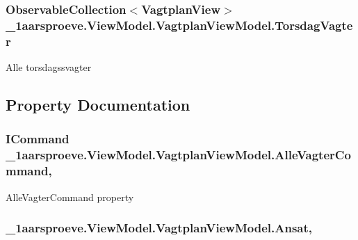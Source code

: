 \subsubsection[{Torsdag\+Vagter}]{\setlength{\rightskip}{0pt plus 5cm}Observable\+Collection$<${\bf Vagtplan\+View}$>$ \+\_\+1aarsproeve.\+View\+Model.\+Vagtplan\+View\+Model.\+Torsdag\+Vagter}\label{class__1aarsproeve_1_1_view_model_1_1_vagtplan_view_model_a85143514a9445a534a3518738e53df82}


Alle torsdagssvagter 



\subsection{Property Documentation}
\hypertarget{class__1aarsproeve_1_1_view_model_1_1_vagtplan_view_model_a9ff1365b62555d179cf34a5e11a6d5fc}{}
\subsubsection[{Alle\+Vagter\+Command}]{\setlength{\rightskip}{0pt plus 5cm}I\+Command \+\_\+1aarsproeve.\+View\+Model.\+Vagtplan\+View\+Model.\+Alle\+Vagter\+Command\hspace{0.3cm}{\ttfamily [get]}, {\ttfamily [set]}}\label{class__1aarsproeve_1_1_view_model_1_1_vagtplan_view_model_a9ff1365b62555d179cf34a5e11a6d5fc}


Alle\+Vagter\+Command property 

\hypertarget{class__1aarsproeve_1_1_view_model_1_1_vagtplan_view_model_acfc1e3ec69784426fcdecb303c0c1f94}{}
\subsubsection[{Ansat}]{ \+\_\+1aarsproeve.\+View\+Model.\+Vagtplan\+View\+Model.\+Ansat\hspace{0.3cm}{\ttfamily [get]}, {\ttfamily [set]}}\label{class__1aarsproeve_1_1_view_model_1_1_vagtplan_view_model_acfc1e3ec69784426fcdecb303c0c1f94}


